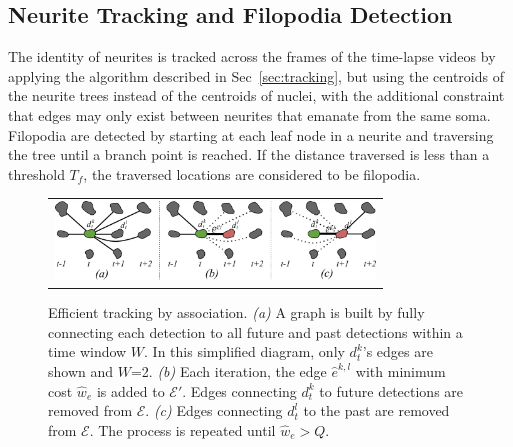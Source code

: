 \subsection{Neurite Tracking and Filopodia Detection}
\label{sec:neurite}
\vspace{-2mm} The identity of neurites is tracked
across the frames of the time-lapse videos by
applying the algorithm described in
Sec~\ref{sec:tracking}, but using the centroids of
the neurite trees instead of the centroids of
nuclei, with the additional constraint that edges
may only exist between neurites that emanate from
the same soma.  Filopodia are detected by starting
at each leaf node in a neurite and traversing the
tree until a branch point is reached. If the
distance traversed is less than a threshold $T_f$,
the traversed locations are considered to be
filopodia.


\begin{figure}[t]
  \centering
       \begin{tabular}{@{\hspace{-1mm}}c@{}}
        \includegraphics[width = 85mm] {images/greedytracking.pdf}\\ [-2.4ex]
       \end{tabular} 
    \caption{ \footnotesize Efficient tracking by
      association.  {\em (a)} A graph is built by
      fully connecting each detection to all
      future and past detections within a time
      window $W$.  In this simplified diagram,
      only $d^k_t$'s edges are shown and
      $W$=2. {\em (b)} Each iteration, the edge
      $\hat{e}^{k,l}$ with minimum cost
      $\hat{w}_e$ is added to $\mathcal{E}'$.
      Edges connecting $d^k_t$ to future
      detections are removed from $\mathcal{E}$.
      {\em (c)} Edges connecting $d^l_t$ to the
      past are removed from $\mathcal{E}$.  The
      process is repeated until $\hat w_e > Q$. }
    \label{fig:greedytracking}
\end{figure}


